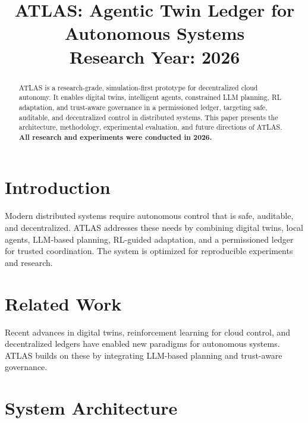 \documentclass[conference]{IEEEtran}
\title{ATLAS: Agentic Twin Ledger for Autonomous Systems\\\vspace{0.5em}\large{Research Year: 2026}}
\author{\IEEEauthorblockN{George David Tsitlauri}
\IEEEauthorblockA{\textit{Dept. of Informatics \& Telecommunications}\\
\textit{University of Thessaly, Greece}\\
gdtsitlauri@gmail.com}}
\begin{document}
\maketitle

\begin{abstract}
ATLAS is a research-grade, simulation-first prototype for decentralized cloud autonomy. It enables digital twins, intelligent agents, constrained LLM planning, RL adaptation, and trust-aware governance in a permissioned ledger, targeting safe, auditable, and decentralized control in distributed systems. This paper presents the architecture, methodology, experimental evaluation, and future directions of ATLAS.\\
\textbf{All research and experiments were conducted in 2026.}
\end{abstract}

\section{Introduction}
Modern distributed systems require autonomous control that is safe, auditable, and decentralized. ATLAS addresses these needs by combining digital twins, local agents, LLM-based planning, RL-guided adaptation, and a permissioned ledger for trusted coordination. The system is optimized for reproducible experiments and research.

\section{Related Work}
Recent advances in digital twins, reinforcement learning for cloud control, and decentralized ledgers have enabled new paradigms for autonomous systems. ATLAS builds on these by integrating LLM-based planning and trust-aware governance.

\section{System Architecture}
\end{document}
